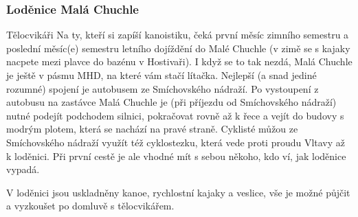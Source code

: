 \subsubsection{Loděnice Malá Chuchle}
{Tělocvikáři}
Na ty, kteří si zapíší kanoistiku, čeká první měsíc zimního semestru a poslední
měsíc(e) semestru letního dojíždění do Malé Chuchle (v zimě se s kajaky nacpete
mezi plavce do bazénu v Hostivaři). I když se to tak nezdá, Malá Chuchle je
ještě v pásmu MHD, na které vám stačí lítačka. Nejlepší (a snad jediné rozumné)
spojení je autobusem ze Smíchovského nádraží. Po vystoupení z autobusu na
zastávce Malá Chuchle je (při příjezdu od Smíchovského nádraží) nutné podejít
podchodem silnici, pokračovat rovně až k řece a vejít do budovy s modrým plotem,
která se nachází na pravé straně. Cyklisté můžou ze Smíchovského nádraží využít
též cyklostezku, která vede proti proudu Vltavy až k loděnici. Při první cestě
je ale vhodné mít s sebou někoho, kdo ví, jak loděnice vypadá.

V loděnici jsou uskladněny kanoe, rychlostní kajaky a veslice, vše je možné
půjčit a vyzkoušet po domluvě s tělocvikářem.